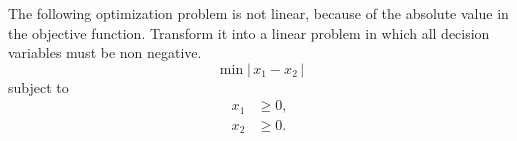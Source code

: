 
The following optimization problem is not linear, because of the
  absolute value in the objective function. Transform it into a linear
  problem in which all decision variables must be non negative.
\[
\min |\,x_1-x_2\,|
\]
subject to
\begin{align*}
x_1& \geq 0,\\
x_2&\geq 0.
\end{align*}




